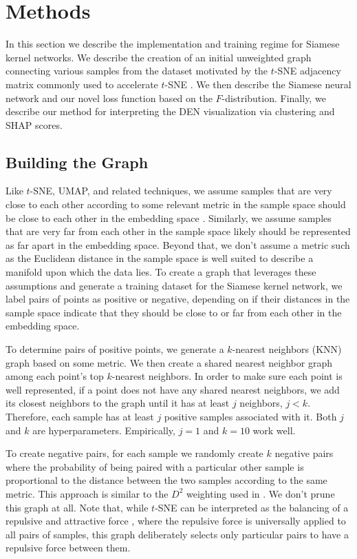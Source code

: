 \documentclass{article}
\begin{document}
\section{Methods}

In this section we describe the implementation and training regime for Siamese kernel networks. We describe the creation of an initial unweighted graph connecting various samples from the dataset motivated by the $t$-SNE adjacency matrix commonly used to accelerate $t$-SNE \cite{linderman2019fast}. We then describe the Siamese neural network and our novel loss function based on the $F$-distribution. Finally, we describe our method for interpreting the DEN visualization via clustering and SHAP scores.

\subsection{Building the Graph}

Like $t$-SNE, UMAP, and related techniques, we assume samples that are very close to each other according to some relevant metric in the sample space should be close to each other in the embedding space \cite{maaten2008visualizing, 2018arXivUMAP}. Similarly, we assume samples that are very far from each other in the sample space likely should be represented as far apart in the embedding space. Beyond that, we don't assume a metric such as the Euclidean distance in the sample space is well suited to describe a manifold upon which the data lies. To create a graph that leverages these assumptions and generate a training dataset for the Siamese kernel network, we label pairs of points as positive or negative, depending on if their distances in the sample space indicate that they should be close to or far from each other in the embedding space.

To determine pairs of positive points, we generate a $k$-nearest neighbors (KNN) graph based on some metric. We then create a shared nearest neighbor graph \cite{ertoz2002new} among each point's top $k$-nearest neighbors. In order to make sure each point is well represented, if a point does not have any shared nearest neighbors, we add its closest neighbors to the graph until it has at least $j$ neighbors, $j<k$. Therefore, each sample has at least $j$ positive samples associated with it. Both $j$ and $k$ are hyperparameters. Empirically, $j=1$ and $k=10$ work well.

To create negative pairs, for each sample we randomly create $k$ negative pairs where the probability of being paired with a particular other sample is proportional to the distance between the two samples according to the same metric. This approach is similar to the $D^2$ weighting used in \cite{arthur2006k}. We don't prune this graph at all. Note that, while $t$-SNE can be interpreted as the balancing of a repulsive and attractive force \cite{maaten2008visualizing}, where the repulsive force is universally applied to all pairs of samples, this graph deliberately selects only particular pairs to have a repulsive force between them.
\end{document}
